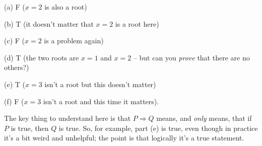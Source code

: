 (a) F ($x=2$ is also a root)

(b) T (it doesn't matter that $x=2$ is a root here)

(c) F ($x=2$ is a problem again)

(d) T (the two roots are $x=1$ and $x=2$ -- but can you \emph{prove} that there are no others?)

(e) T ($x=3$ isn't a root but this doesn't matter)

(f) F ($x=3$ isn't a root and this time it matters).

The key thing to understand here is that $P \Rightarrow Q$ means, and \emph{only} means, that if $P$ is true, then $Q$ is true. So, for example, part (e) is true, even though in practice it's a bit weird and unhelpful; the point is that logically it's a true statement.
